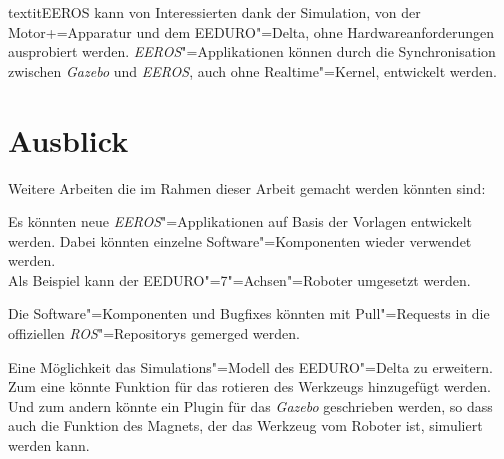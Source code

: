 textit{EEROS} kann von Interessierten dank der Simulation, von der Motor+=Apparatur und dem EEDURO"=Delta, ohne Hardwareanforderungen ausprobiert werden.
\textit{EEROS}"=Applikationen können durch die Synchronisation zwischen \textit{Gazebo} und \textit{EEROS}, auch ohne Realtime"=Kernel, entwickelt werden.

 

\section{Ausblick}

Weitere Arbeiten die im Rahmen dieser Arbeit gemacht werden könnten sind:

Es könnten neue \textit{EEROS}"=Applikationen auf Basis der Vorlagen entwickelt werden.
Dabei könnten einzelne Software"=Komponenten wieder verwendet werden.\\
Als Beispiel kann der EEDURO"=7"=Achsen"=Roboter umgesetzt werden.

Die Software"=Komponenten und Bugfixes könnten mit Pull"=Requests in die offiziellen \textit{ROS}"=Repositorys gemerged werden.

Eine Möglichkeit das Simulations"=Modell des EEDURO"=Delta zu erweitern.
Zum eine könnte Funktion für das rotieren des Werkzeugs hinzugefügt werden.
Und zum andern könnte ein Plugin für das \textit{Gazebo} geschrieben werden, so dass auch die Funktion des Magnets, der das Werkzeug vom Roboter ist, simuliert werden kann.


